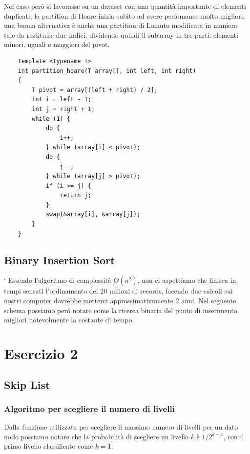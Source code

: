 \documentclass[letterpaper]{report}
\begin{document}
Nel caso però si lavorasse su un dataset con una quantità importante di elementi
duplicati, la partition di Hoare inizia subito ad avere perfomance molto migliori,
una buona alternativa è anche una partition di Lomuto modificata in maniera tale
da restituire due indici, dividendo quindi il subarray in tre parti:
elementi minori, uguali e maggiori del pivot.

\begin{lstlisting}
    template <typename T>
    int partition_hoare(T array[], int left, int right)
    {
        T pivot = array[(left + right) / 2];
        int i = left - 1;
        int j = right + 1;
        while (1) {
            do {
                i++;
            } while (array[i] < pivot);
            do {
                j--;
            } while (array[j] > pivot);
            if (i >= j) {
                return j;
            }
            swap(&array[i], &array[j]);
        }
    }
\end{lstlisting}

\newpage
\section{Binary Insertion Sort}`
Essendo l'algoritmo di complessità $O(n^2)$, non ci aspettiamo che finisca in tempi
sensati l'ordinamento dei 20 milioni di records, facendo due calcoli sui nostri computer
dovrebbe metterci approssimativmaente 2 anni.
Nel seguente schema possiamo però notare come la ricerca binaria del punto di inserimento
migliori notevolmente la costante di tempo.
\begin{figure}[H]
\centering
    
\end{figure}

\chapter*{Esercizio 2}

\section{Skip List}
\subsection{Algoritmo per scegliere il numero di livelli}
Dalla funzione utilizzata per scegliere il massimo numero di livelli per un dato
nodo possiamo notare che la probabilità di scegliere un livello $k$ è $1/2^{k - 1}$, con
il primo livello classificato come $k = 1$.
\end{document}
